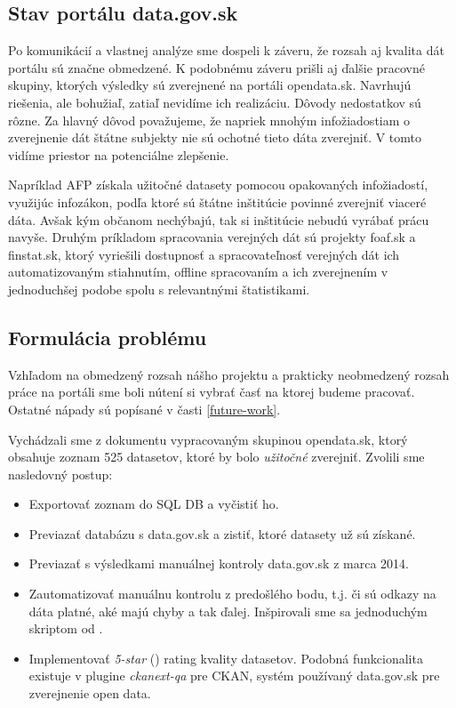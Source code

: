 \documentclass[12pt,a4paper]{article}
\begin{document}
\subsection{Stav portálu data.gov.sk} 
Po komunikácií a vlastnej analýze sme dospeli k záveru, že rozsah aj kvalita dát portálu sú značne obmedzené. K podobnému záveru prišli aj ďalšie pracovné skupiny, ktorých výsledky sú zverejnené na portáli opendata.sk. Navrhujú riešenia, ale bohužiaľ, zatiaľ nevidíme ich realizáciu. Dôvody nedostatkov sú rôzne. Za hlavný dôvod považujeme, že napriek mnohým infožiadostiam o zverejnenie dát štátne subjekty nie sú ochotné tieto dáta zverejniť. V tomto vidíme priestor na potenciálne zlepšenie. 

Napríklad AFP získala užitočné datasety pomocou opakovaných infožiadostí, využijúc infozákon, podľa ktoré sú štátne inštitúcie povinné zverejniť viaceré dáta. Avšak kým občanom nechýbajú, tak si inštitúcie nebudú vyrábať prácu navyše. Druhým príkladom spracovania verejných dát sú projekty foaf.sk a finstat.sk, ktorý vyriešili dostupnosť a spracovateľnosť verejných dát ich automatizovaným stiahnutím, offline spracovaním a ich zverejnením v jednoduchšej podobe spolu s relevantnými štatistikami. 

\subsection{Formulácia problému} 
\label{problem-statement}

Vzhľadom na obmedzený rozsah nášho projektu a prakticky neobmedzený rozsah práce na portáli sme boli nútení si vybrať časť na ktorej budeme pracovať. Ostatné nápady sú popísané v časti \ref{future-work}. 

Vychádzali sme z dokumentu \cite{525} vypracovaným skupinou opendata.sk, ktorý obsahuje zoznam 525 datasetov, ktoré by bolo \emph{užitočné} zverejniť. Zvolili sme nasledovný postup:  
\begin{itemize} 
\item Exportovať zoznam do SQL DB a vyčistiť ho. 
\item Previazať databázu s data.gov.sk a zistiť, ktoré datasety už sú získané. 
\item Previazať s výsledkami manuálnej kontroly data.gov.sk z marca 2014. 
\item Zautomatizovať manuálnu kontrolu z predošlého bodu, t.j. či sú odkazy na dáta platné, aké majú chyby a tak ďalej. Inšpirovali sme sa jednoduchým skriptom od \cite{hany}. 
\item Implementovať \emph{5-star} (\cite{5star}) rating kvality datasetov. Podobná funkcionalita existuje v plugine \emph{ckanext-qa} pre CKAN, systém používaný data.gov.sk pre zverejnenie open data.  
\end{itemize} 
\end{document}
